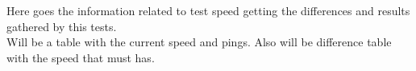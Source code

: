Here goes the information related to test speed getting the differences and results gathered by this tests.\\

Will be a table with the current speed and pings. Also will be difference table with the speed that must has.\\
